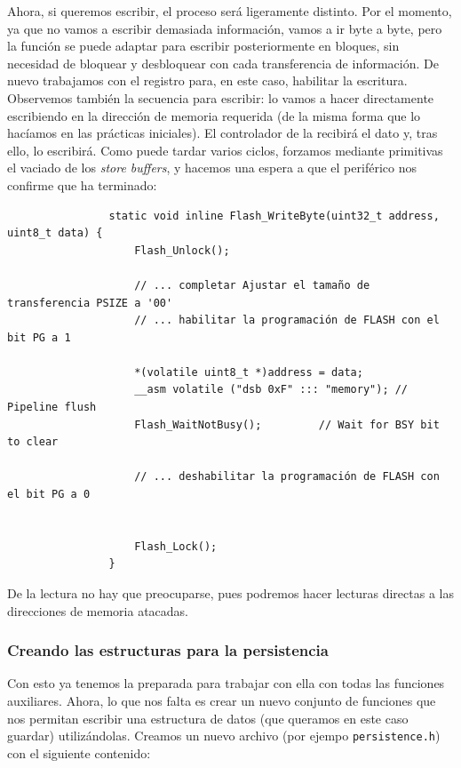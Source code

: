 \documentclass[../main.tex]{subfiles}
\begin{document}
            Ahora, si queremos escribir, el proceso será ligeramente distinto. Por el momento, ya que no vamos a escribir demasiada información, vamos a ir byte a byte, pero la función se puede adaptar para escribir posteriormente en bloques, sin necesidad de bloquear y desbloquear con cada transferencia de información. De nuevo trabajamos con el registro  para, en este caso, habilitar la escritura. Observemos también la secuencia para escribir: lo vamos a hacer directamente escribiendo en la dirección de memoria requerida (de la misma forma que lo hacíamos en las prácticas iniciales). El controlador de la  recibirá el dato y, tras ello, lo escribirá. Como puede tardar varios ciclos, forzamos mediante primitivas el vaciado de los \emph{store buffers}, y hacemos una espera a que el periférico nos confirme que ha terminado:

            \begin{lstlisting}
                static void inline Flash_WriteByte(uint32_t address, uint8_t data) {
                    Flash_Unlock();

                    // ... completar Ajustar el tamaño de transferencia PSIZE a '00'
                    // ... habilitar la programación de FLASH con el bit PG a 1

                    *(volatile uint8_t *)address = data;
                    __asm volatile ("dsb 0xF" ::: "memory"); // Pipeline flush
                    Flash_WaitNotBusy();         // Wait for BSY bit to clear

                    // ... deshabilitar la programación de FLASH con el bit PG a 0


                    Flash_Lock();
                }
            \end{lstlisting}

            De la lectura no hay que preocuparse, pues podremos hacer lecturas directas a las direcciones de memoria atacadas.
           
        \subsubsection{Creando las estructuras para la persistencia}
            Con esto ya tenemos la  preparada para trabajar con ella con todas las funciones auxiliares. Ahora, lo que nos falta es crear un nuevo conjunto de funciones que nos permitan escribir una estructura de datos (que queramos en este caso guardar) utilizándolas. Creamos un nuevo archivo (por ejempo \texttt{persistence.h}) con el siguiente contenido:
\end{document}
